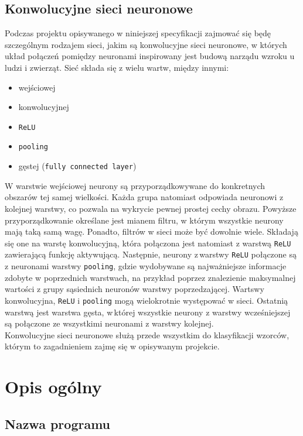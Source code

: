 \documentclass[a4paper,12pt]{article}
\begin{document}
\subsection{Konwolucyjne sieci neuronowe}

Podczas projektu opisywanego w niniejszej specyfikacji zajmować się będę szczególnym rodzajem sieci, jakim są konwolucyjne sieci neuronowe, w których układ połączeń pomiędzy neuronami inspirowany jest budową narządu wzroku u ludzi i zwierząt. Sieć składa się z wielu wartw, między innymi:
\begin{itemize}
\item wejściowej
\item konwolucyjnej
\item \texttt{ReLU}
\item \texttt{pooling}
\item gęstej (\texttt{fully connected layer})
\end{itemize} 

W warstwie wejściowej neurony są przyporządkowywane do konkretnych obszarów tej samej wielkości. Każda grupa natomiast odpowiada neuronowi z kolejnej warstwy, co pozwala na wykrycie pewnej prostej cechy obrazu. Powyższe przyporządkowanie określane jest mianem filtru, w którym wszystkie neurony mają taką samą wagę. Ponadto, filtrów w sieci może być dowolnie wiele. Składają się one na warstę konwolucyjną, która połączona jest natomiast z warstwą \texttt{ReLU} zawierającą funkcję aktywującą. Następnie, neurony z\,warstwy \texttt{ReLU} połączone są z neuronami warstwy \texttt{pooling}, gdzie wydobywane są najważniejsze informacje zdobyte w poprzednich warstwach, na przykład poprzez znalezienie maksymalnej wartości z grupy sąsiednich neuronów warstwy poprzedzającej. Wartswy konwolucyjna, \texttt{ReLU} i \texttt{pooling} mogą wielokrotnie występować w sieci. Ostatnią warstwą jest warstwa gęsta, w\,której wszystkie neurony z warstwy wcześniejszej są połączone ze wszystkimi neuronami z warstwy kolejnej.\\ 

Konwolucyjne sieci neuronowe służą przede wszystkim do klasyfikacji wzorców, którym to zagadnieniem zajmę się w opisywanym projekcie.

\section{Opis ogólny}

\subsection{Nazwa programu}
\end{document}

